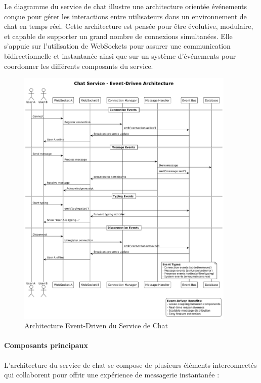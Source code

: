 \documentclass{rapportPfe}
\begin{document}
Le diagramme du service de chat illustre une architecture orientée événements conçue pour gérer les interactions entre utilisateurs dans un environnement de chat en temps réel. Cette architecture est pensée pour être évolutive, modulaire, et capable de supporter un grand nombre de connexions simultanées. Elle s'appuie sur l'utilisation de WebSockets pour assurer une communication bidirectionnelle et instantanée ainsi que sur un système d'événements pour coordonner les différents composants du service.

\begin{figure}[htbp]
    \centering
    \includegraphics[width=0.93\textwidth]{diagrams/diagram4.png}
    \caption{Architecture Event-Driven du Service de Chat}
    \label{fig:chat-service-architecture}
\end{figure}

\paragraph{Composants principaux}

L'architecture du service de chat se compose de plusieurs éléments interconnectés qui collaborent pour offrir une expérience de messagerie instantanée :
\end{document}
